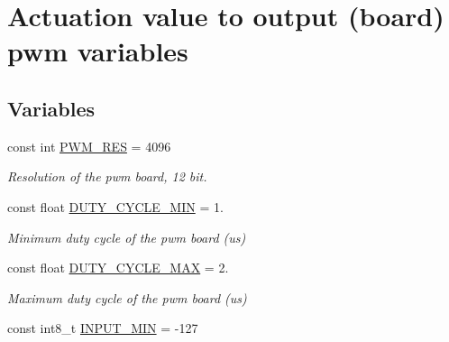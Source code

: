 \hypertarget{group__ActuationToOutput}{}\section{Actuation value to output (board) pwm variables}
\label{group__ActuationToOutput}
\subsection*{Variables}
\begin{DoxyCompactItemize}
\item 
const int \hyperlink{group__ActuationToOutput_ga3de5d6c408f667c395ab2b236e059724}{P\+W\+M\+\_\+\+R\+ES} = 4096\hypertarget{group__ActuationToOutput_ga3de5d6c408f667c395ab2b236e059724}{}\label{group__ActuationToOutput_ga3de5d6c408f667c395ab2b236e059724}

\begin{DoxyCompactList}\small\item\em Resolution of the pwm board, 12 bit. \end{DoxyCompactList}\item 
const float \hyperlink{group__ActuationToOutput_gadf577758fd2164217d18fb25c119c974}{D\+U\+T\+Y\+\_\+\+C\+Y\+C\+L\+E\+\_\+\+M\+IN} = 1.\hypertarget{group__ActuationToOutput_gadf577758fd2164217d18fb25c119c974}{}\label{group__ActuationToOutput_gadf577758fd2164217d18fb25c119c974}

\begin{DoxyCompactList}\small\item\em Minimum duty cycle of the pwm board (us) \end{DoxyCompactList}\item 
const float \hyperlink{group__ActuationToOutput_ga716fdda2246d4b15a6b8d32444ac8439}{D\+U\+T\+Y\+\_\+\+C\+Y\+C\+L\+E\+\_\+\+M\+AX} = 2.\hypertarget{group__ActuationToOutput_ga716fdda2246d4b15a6b8d32444ac8439}{}\label{group__ActuationToOutput_ga716fdda2246d4b15a6b8d32444ac8439}

\begin{DoxyCompactList}\small\item\em Maximum duty cycle of the pwm board (us) \end{DoxyCompactList}\item 
const int8\+\_\+t \hyperlink{group__ActuationToOutput_ga1f805f05ca679b7b28951bfa6659294d}{I\+N\+P\+U\+T\+\_\+\+M\+IN} = -\/127\hypertarget{group__ActuationToOutput_ga1f805f05ca679b7b28951bfa6659294d}{}\label{group__ActuationToOutput_ga1f805f05ca679b7b28951bfa6659294d}


\end{DoxyCompactItemize}
